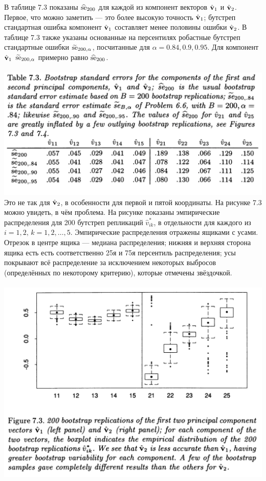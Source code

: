 В таблице 7.3 показаны $\widehat{\text{se}}_{200}$ для каждой из компонент векторов $\hat{\mathbf{v}}_1$ и $\hat{\mathbf{v}}_2$. Первое, что можно заметить --- это более высокую точность $\hat{\mathbf{v}}_1$; бутстреп стандартная ошибка компонент $\hat{\mathbf{v}}_1$ составляет менее половины ошибки $\hat{\mathbf{v}}_2$. В таблице 7.3 также указаны основанные на персентилях робастные бутстреп стандартные ошибки $\widetilde{\text{se}}_{200,\alpha}$, посчитанные для $\alpha = 0.84, 0.9, 0.95$. Для компонент $\hat{\mathbf{v}}_1$ $\widetilde{\text{se}}_{200, \alpha}$ примерно равно $\widehat{\text{se}}_{200}$. 
\\~\\
\noindent
\includegraphics[width=0.9\linewidth]{6/t73.png}
\newline
\setcounter{table}{3}
Это не так для $\hat{\mathbf{v}}_2$, в особенности для первой и пятой координаты. На рисунке 7.3 можно увидеть, в чём проблема. На рисунке показаны эмпирические распределения для 200 бутстреп репликаций $\hat v_{ik}^*$, в отдельности для каждого из $i = 1,2,\, k = 1,2,\ldots, 5$. Эмпирические распределения отражены ящиками с усами. Отрезок в центре ящика --- медиана распределения; нижняя и верхняя сторона ящика есть есть соответственно 25я и 75я персентиль распределения; усы покрывают всё распределение за исключением некоторых выбросов (определённых по некоторому критерию), которые отмечены звёздочкой.
\\~\\
\noindent
\includegraphics[width=0.9\linewidth]{6/f73.png}
\newline
\setcounter{figure}{3}

